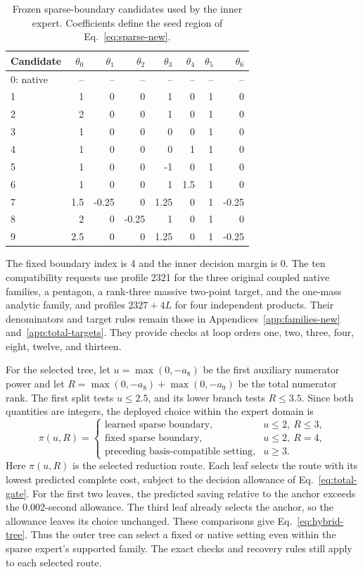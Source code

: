 \begin{table}[!htbp]\centering\small
\caption{Frozen sparse-boundary candidates used by the inner expert. Coefficients define the seed region of Eq.~\eqref{eq:sparse-new}.}
\label{tab:hybrid-boundaries}
\begin{tabular}{@{}lrrrrrrr@{}}\toprule
Candidate & $\theta_0$ & $\theta_1$ & $\theta_2$ & $\theta_3$ & $\theta_4$ & $\theta_5$ & $\theta_6$\\\midrule
0: native & -- & -- & -- & -- & -- & -- & --\\
1 & 1 & 0 & 0 & 1 & 0 & 1 & 0\\
2 & 2 & 0 & 0 & 1 & 0 & 1 & 0\\
3 & 1 & 0 & 0 & 0 & 0 & 1 & 0\\
4 & 1 & 0 & 0 & 0 & 1 & 1 & 0\\
5 & 1 & 0 & 0 & -1 & 0 & 1 & 0\\
6 & 1 & 0 & 0 & 1 & 1.5 & 1 & 0\\
7 & 1.5 & -0.25 & 0 & 1.25 & 0 & 1 & -0.25\\
8 & 2 & 0 & -0.25 & 1 & 0 & 1 & 0\\
9 & 2.5 & 0 & 0 & 1.25 & 0 & 1 & -0.25\\
\bottomrule\end{tabular}\end{table}

The fixed boundary index is 4 and the inner decision margin is 0. The ten compatibility requests use profile 2321 for the three original coupled native families, a pentagon, a rank-three massive two-point target, and the one-mass analytic family, and profiles $2327+4L$ for four independent products. Their denominators and target rules remain those in Appendices~\ref{app:families-new} and~\ref{app:total-targets}. They provide checks at loop orders one, two, three, four, eight, twelve, and thirteen.

For the selected tree, let $u=\max(0,-a_8)$ be the first auxiliary numerator power and let $R=\max(0,-a_8)+\max(0,-a_9)$ be the total numerator rank. The first split tests $u\leq2.5$, and its lower branch tests $R\leq3.5$. Since both quantities are integers, the deployed choice within the expert domain is
\begin{equation}
 \pi(u,R)=\begin{cases}
  \text{learned sparse boundary},&u\leq2,\ R\leq3,\\
  \text{fixed sparse boundary},&u\leq2,\ R=4,\\
  \text{preceding basis-compatible setting},&u\geq3.
 \end{cases}
 \label{eq:hybrid-tree}
\end{equation}
Here $\pi(u,R)$ is the selected reduction route. Each leaf selects the route with its lowest predicted complete cost, subject to the decision allowance of Eq.~\eqref{eq:total-gate}. For the first two leaves, the predicted saving relative to the anchor exceeds the 0.002-second allowance. The third leaf already selects the anchor, so the allowance leaves its choice unchanged. These comparisons give Eq.~\eqref{eq:hybrid-tree}. Thus the outer tree can select a fixed or native setting even within the sparse expert's supported family. The exact checks and recovery rules still apply to each selected route.
